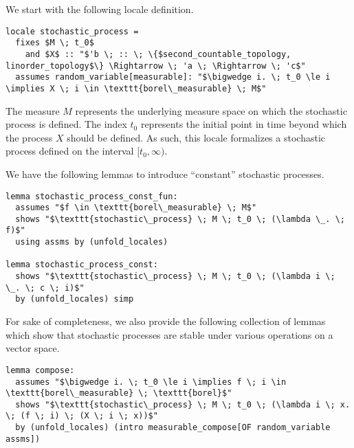 We start with the following locale definition.
\pagebreak

\begin{isadefinition}
{\small
\begin{lstlisting}[style=isabelle]
locale stochastic_process =
  fixes $M \; t_0$ 
    and $X$ :: "$'b \; :: \; \{$second_countable_topology, linorder_topology$\} \Rightarrow \; 'a \; \Rightarrow \; 'c$"
  assumes random_variable[measurable]: "$\bigwedge i. \; t_0 \le i \implies X \; i \in \texttt{borel\_measurable} \; M$"
\end{lstlisting}
}
\end{isadefinition}

The measure $M$ represents the underlying measure space on which the stochastic process is defined. The index $t_0$ represents the initial point in time beyond which the process $X$ should be defined. As such, this locale formalizes a stochastic process defined on the interval $[t_0, \infty)$. 

We have the following lemmas to introduce ``constant'' stochastic processes.

\begin{isalemma}
{\small
\begin{lstlisting}[style=isabelle]
lemma stochastic_process_const_fun:
  assumes "$f \in \texttt{borel\_measurable} \; M$"
  shows "$\texttt{stochastic\_process} \; M \; t_0 \; (\lambda \_. \; f)$"
  using assms by (unfold_locales)

lemma stochastic_process_const:
  shows "$\texttt{stochastic\_process} \; M \; t_0 \; (\lambda i \; \_. \; c \; i)$" 
  by (unfold_locales) simp

\end{lstlisting}
}
\end{isalemma}

For sake of completeness, we also provide the following collection of lemmas which show that stochastic processes are stable under various operations on a vector space.

\begin{isalemma}
{\small
\begin{lstlisting}[style=isabelle]
lemma compose:
  assumes "$\bigwedge i. \; t_0 \le i \implies f \; i \in \texttt{borel\_measurable} \; \texttt{borel}$"
  shows "$\texttt{stochastic\_process} \; M \; t_0 \; (\lambda i \; x. \; (f \; i) \; (X \; i \; x))$"
  by (unfold_locales) (intro measurable_compose[OF random_variable assms])
  \end{lstlisting}
}
\end{isalemma}


